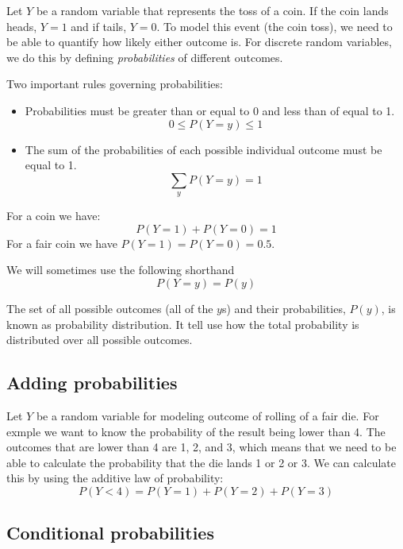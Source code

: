 Let $Y$ be a random variable that represents the toss of a coin. If the coin lands heads,
$Y=1$ and if tails, $Y = 0$. To model this event (the coin toss), we need to be able
to quantify how likely either outcome is. For discrete random variables, we do this
by defining \emph{probabilities} of different outcomes.

Two important rules governing probabilities:
\begin{itemize}
%
\item Probabilities must be greater than or equal to 0 and less than of equal to 1.
\begin{equation}
0 \leq P(Y=y) \leq 1
\end{equation}
%
\item The sum of the probabilities of each possible individual outcome must be
equal to 1.
\begin{equation}
\sum_{y} P(Y=y) = 1
\end{equation}
%
\end{itemize}

For a coin we have:
\begin{equation}
P(Y=1) + P(Y=0) = 1
\end{equation}
For a fair coin we have $P(Y=1) = P(Y=0) = 0.5$.

We will sometimes use the following shorthand
\begin{equation}
P(Y=y) = P(y)
\end{equation}

The set of all possible outcomes (all of the $y$s) and their probabilities, $P(y)$,
is known as probability distribution. It tell use how the total probability is
distributed over all possible outcomes.

\subsection{Adding probabilities}

Let $Y$ be a random variable for modeling outcome of rolling of a fair die.
For exmple we want to know the probability of the result being lower than 4.
The outcomes that are lower than 4 are 1, 2, and 3, which means that we need
to be able to calculate the probability that the die lands 1 or 2 or 3.
We can calculate this by using the additive law of probability:
\begin{equation*}
P(Y < 4) = P(Y=1) + P(Y=2) + P(Y=3)
\end{equation*}

\subsection{Conditional probabilities}

